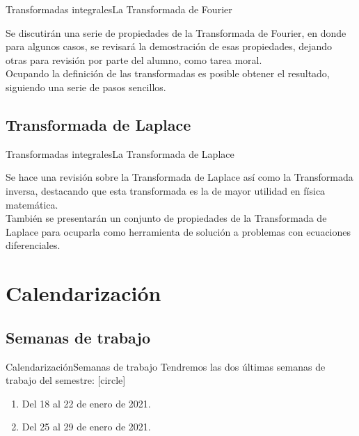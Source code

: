\documentclass[10pt]{beamer}
\begin{document}
\begin{frame}{Transformadas integrales}{La Transformada de Fourier}

Se discutirán una serie de propiedades de la Transformada de Fourier, en donde para algunos casos, se revisará la demostración de esas propiedades, dejando otras para revisión por parte del alumno, como tarea moral.
\\
\bigskip
\pause
Ocupando la definición de las transformadas es posible obtener el resultado, siguiendo una serie de pasos sencillos.

\end{frame}

\subsection{Transformada de Laplace}

\begin{frame}{Transformadas integrales}{La Transformada de Laplace}

Se hace una revisión sobre la Transformada de Laplace así como la Transformada inversa, destacando que esta transformada es la de mayor utilidad en física matemática.
\\
\bigskip
\pause
También se presentarán un conjunto de propiedades de la Transformada de Laplace para ocuparla como herramienta de solución a problemas con ecuaciones diferenciales.
\end{frame}


\section{Calendarización}

\subsection{Semanas de trabajo}

\begin{frame}{Calendarización}{Semanas de trabajo}
Tendremos las dos últimas semanas de trabajo del semestre:
[circle]
\begin{enumerate}[<+->]
\item Del 18 al 22 de enero de 2021.
\item Del 25 al 29 de enero de 2021.
\end{enumerate}
\end{frame}
\end{document}
